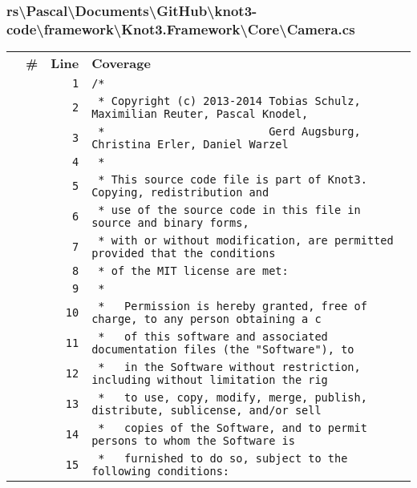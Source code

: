 \documentclass[a4paper,10pt]{article}
\begin{document}
\subsubsection{rs\textbackslash Pascal\textbackslash Documents\textbackslash GitHub\textbackslash knot3-code\textbackslash framework\textbackslash Knot3.Framework\textbackslash Core\textbackslash Camera.cs}
\begin{longtable}[l]{lrrl}
\textbf{} & \textbf{\#} & \textbf{Line} & \textbf{Coverage}\\
\cellcolor{gray} &  & \verb~1~ & \verb~/*~\\
\cellcolor{gray} &  & \verb~2~ & \verb~ * Copyright (c) 2013-2014 Tobias Schulz, Maximilian Reuter, Pascal Knodel,~\\
\cellcolor{gray} &  & \verb~3~ & \verb~ *                         Gerd Augsburg, Christina Erler, Daniel Warzel~\\
\cellcolor{gray} &  & \verb~4~ & \verb~ *~\\
\cellcolor{gray} &  & \verb~5~ & \verb~ * This source code file is part of Knot3. Copying, redistribution and~\\
\cellcolor{gray} &  & \verb~6~ & \verb~ * use of the source code in this file in source and binary forms,~\\
\cellcolor{gray} &  & \verb~7~ & \verb~ * with or without modification, are permitted provided that the conditions~\\
\cellcolor{gray} &  & \verb~8~ & \verb~ * of the MIT license are met:~\\
\cellcolor{gray} &  & \verb~9~ & \verb~ *~\\
\cellcolor{gray} &  & \verb~10~ & \verb~ *   Permission is hereby granted, free of charge, to any person obtaining a c~\\
\cellcolor{gray} &  & \verb~11~ & \verb~ *   of this software and associated documentation files (the "Software"), to ~\\
\cellcolor{gray} &  & \verb~12~ & \verb~ *   in the Software without restriction, including without limitation the rig~\\
\cellcolor{gray} &  & \verb~13~ & \verb~ *   to use, copy, modify, merge, publish, distribute, sublicense, and/or sell~\\
\cellcolor{gray} &  & \verb~14~ & \verb~ *   copies of the Software, and to permit persons to whom the Software is~\\
\cellcolor{gray} &  & \verb~15~ & \verb~ *   furnished to do so, subject to the following conditions:~\\

\end{longtable}
\end{document}
